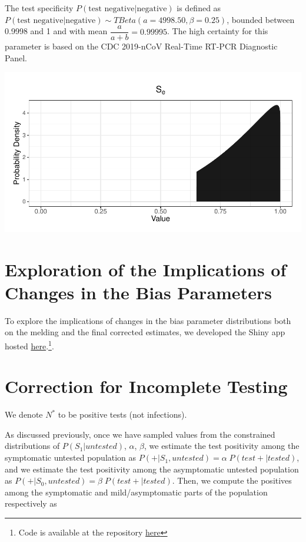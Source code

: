 \documentclass[12pt,twoside]{smiththesis}
\begin{document}
The test specificity \(P(\text{test negative}| \text{negative})\) is defined as \(P(\text{test negative}| \text{negative}) \sim TBeta(a = 4998.50, \beta = 0.25)\), bounded between 0.9998 and 1 and with mean \(\dfrac{a}{a + b} = 0.99995\). The high certainty for this parameter is based on the CDC 2019-nCoV Real-Time RT-PCR Diagnostic Panel.
\begin{center}\includegraphics[width=0.8\linewidth]{thesis_files/figure-latex/unnamed-chunk-61-1} \end{center}

\hypertarget{exploration-of-the-implications-of-changes-in-the-bias-parameters}{%
\section{Exploration of the Implications of Changes in the Bias Parameters}\label{exploration-of-the-implications-of-changes-in-the-bias-parameters}}

To explore the implications of changes in the bias parameter distributions both on the melding and the final corrected estimates, we developed the Shiny app hosted \href{https://q-w-a.shinyapps.io/bayesian_melding_priors/}{here}.\footnote{Code is available at the repository \href{https://github.com/q-w-a/probabilistic_bias_correction}{here}}.

\hypertarget{correction-for-incomplete-testing}{%
\section{Correction for Incomplete Testing}\label{correction-for-incomplete-testing}}

We denote \(N^*\) to be positive tests (not infections).

As discussed previously, once we have sampled values from the constrained distributions of \(P(S_1|untested)\), \(\alpha\), \(\beta\), we estimate the test positivity among the symptomatic untested population as \(P(+|S_1,untested) = \alpha \; P(test +|tested)\), and we estimate the test positivity among the asymptomatic untested population as \(P(+|S_0,untested) = \beta \; P(test +|tested)\). Then, we compute the positives among the symptomatic and mild/asymptomatic parts of the population respectively as
\end{document}
